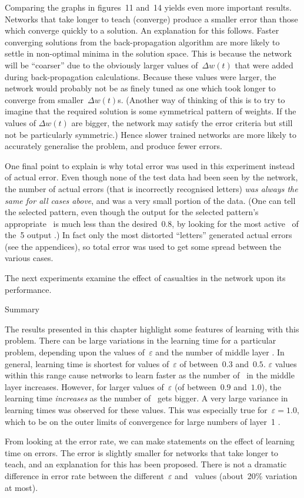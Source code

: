 Comparing the graphs in figures~11 and~14 yields even more important
results.
Networks that take longer to teach (converge) produce a smaller
error than those which converge quickly to a solution.
An explanation for this follows.
Faster converging solutions from the back-propagation algorithm are
more likely to settle in non-optimal minima in the solution space.
This is because the network will be ``coarser'' due to the obviously
larger values of~$\Delta w(t)$ that were added during
back-propagation calculations.
Because these values were larger, the network would probably not be
as finely tuned as one which took longer to converge from
smaller~$\Delta w(t)$s.
(Another way of thinking of this is to try to imagine that the
required solution is some symmetrical pattern of weights.
If the values of $\Delta w(t)$ are bigger, the network may satisfy
the error criteria but still not be particularly symmetric.)
Hence slower trained networks are more likely to accurately
generalise the problem, and produce fewer errors.

One final point to explain is why total error was used in this
experiment instead of actual error.
Even though none of the test data had been seen by the network, the
number of actual errors (that is incorrectly recognised letters)
{\sl was always the same for all cases above\/}, and was a very
small portion of the data.
(One can tell the selected pattern, even though the output for the
selected pattern's appropriate \neu\ is much less than the
desired~$0.8$, by looking for the most active \neu\ of the~5 output
\neus.)
In fact only the most distorted ``letters'' generated actual errors
(see the appendices), so total error was used to get some spread
between the various cases.

The next experiments examine the effect of casualties in the network
upon its performance.

\sec Summary

The results presented in this chapter highlight some features of
learning with this problem.
There can be large variations in the learning time for a particular
problem, depending upon the values of~$\varepsilon$ and the number
of middle layer \neus.
In general, learning time is shortest for values of~$\varepsilon$ of
between~$0.3$ and~$0.5$.
$\varepsilon$ values within this range cause networks to learn
faster as the number of \neus\ in the middle layer increases.
However, for larger values of~$\varepsilon$ (of between~$0.9$
and~$1.0$), the learning time {\sl increases\/} as the number of
\neus\ gets bigger.
A very large variance in learning times was observed for these
values.
This was especially true for~$\varepsilon = 1.0$, which to be on the
outer limits of convergence for large numbers of layer~1 \neus.

From looking at the error rate, we can make statements on the effect
of learning time on errors.
The error is slightly smaller for networks that take longer to
teach, and an explanation for this has been proposed.
There is not a dramatic difference in error rate between the
different~$\varepsilon$ and \neu\ values (about~20\% variation
at most).


